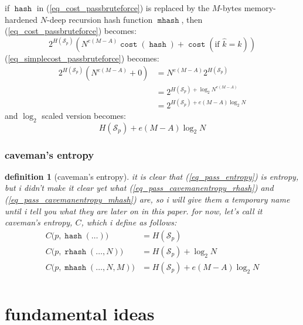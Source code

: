 \documentclass[twocolumn]{article}
\newtheorem{definition}{definition}
\DeclareMathOperator{\hash}{\mathtt{hash}}
\DeclareMathOperator{\rhash}{\mathtt{rhash}}
\DeclareMathOperator{\mhash}{\mathtt{mhash}}
\DeclareMathOperator{\cost}{\mathtt{cost}}
\begin{document}
if $\hash$ in (\ref{eq_cost_passbruteforce}) is replaced by the $M$-bytes
memory-hardened $N$-deep recursion hash function $\mhash$, then
(\ref{eq_cost_passbruteforce}) becomes:
\begin{equation}\label{eq_cost_passbruteforce_NM}
    2^{H(\mathcal{S}_p)} \left(
        N^{e(M-A)}\cost(\hash) + \cost(\text{if } \hat k = k)
    \right)
\end{equation}
(\ref{eq_simplecost_passbruteforce}) becomes:
\begin{equation}\label{eq_simplecost_passbruteforce_NM}
    \begin{split}
    2^{H(\mathcal{S}_p)} (N^{e(M-A)}+0) &= N^{e(M-A)} 2^{H(\mathcal{S}_p)} \\
                  &= 2^{H(\mathcal{S}_p) + \log_2 N^{e(M-A)}} \\
                  &= 2^{H(\mathcal{S}_p) + e(M-A)\log_2 N}
    \end{split}
\end{equation}
and $\log_2$ scaled version becomes:
\begin{equation}\label{eq_pass_cavemanentropy_mhash}
    H(\mathcal{S}_p) + e(M-A)\log_2 N
\end{equation}

\subsubsection{caveman's entropy}
\begin{definition}[caveman's entropy]\label{def_cavemanentropy}
it is clear that (\ref{eq_pass_entropy}) is entropy, but i didn't make it
clear yet what (\ref{eq_pass_cavemanentropy_rhash}) and
(\ref{eq_pass_cavemanentropy_mhash}) are, so i will give them a temporary
name until i tell you what they are later on in this paper.  for now, let's
call it \emph{caveman's entropy}, $C$, which i define as follows:
\[
\begin{split}
C\Big(p, \hash(\ldots)\Big) &= H(\mathcal{S}_p) \\
C\Big(p, \rhash(\ldots, N)\Big) &= H(\mathcal{S}_p) + \log_2 N \\
C\Big(p, \mhash(\ldots, N, M)\Big) &= H(\mathcal{S}_p) + e(M-A)\log_2 N \\
\end{split}
\]
\end{definition}

\section{fundamental ideas}
\end{document}

